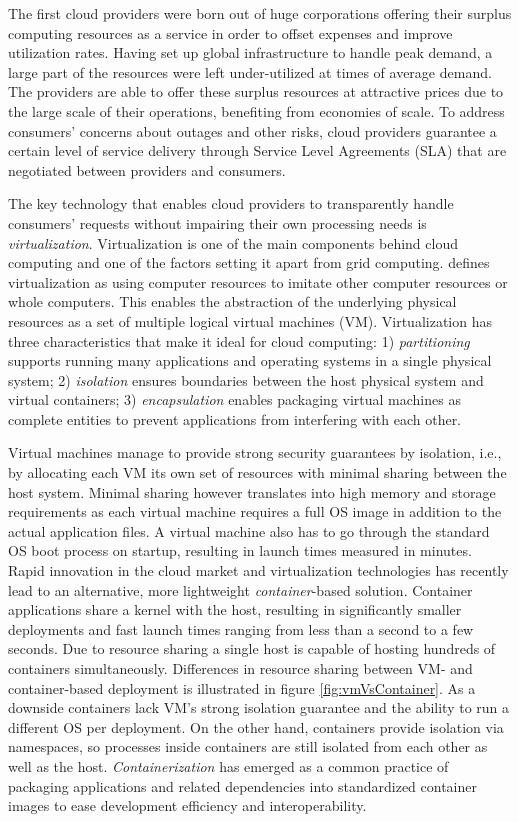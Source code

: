 The first cloud providers were born out of huge corporations offering their surplus computing resources as a service in order to offset expenses and improve utilization rates. Having set up global infrastructure to handle peak demand, a large part of the resources were left under-utilized at times of average demand. The providers are able to offer these surplus resources at attractive prices due to the large scale of their operations, benefiting from economies of scale. To address consumers' concerns about outages and other risks, cloud providers guarantee a certain level of service delivery through Service Level Agreements (SLA) that are negotiated between providers and consumers. \parencite{youseff08cloudOntology}

The key technology that enables cloud providers to transparently handle consumers' requests without impairing their own processing needs is \textit{virtualization}. Virtualization is one of the main components behind cloud computing and one of the factors setting it apart from grid computing. \textcite{sareen13cloudTypes} defines virtualization as using computer resources to imitate other computer resources or whole computers. This enables the abstraction of the underlying physical resources as a set of multiple logical virtual machines (VM). Virtualization has three characteristics that make it ideal for cloud computing: 1) \textit{partitioning} supports running many applications and operating systems in a single physical system; 2) \textit{isolation} ensures boundaries between the host physical system and virtual containers; 3) \textit{encapsulation} enables packaging virtual machines as complete entities to prevent applications from interfering with each other.

Virtual machines manage to provide strong security guarantees by isolation, i.e., by allocating each VM its own set of resources with minimal sharing between the host system. Minimal sharing however translates into high memory and storage requirements as each virtual machine requires a full OS image in addition to the actual application files. A virtual machine also has to go through the standard OS boot process on startup, resulting in launch times measured in minutes. Rapid innovation in the cloud market and virtualization technologies has recently lead to an alternative, more lightweight \textit{container}-based solution. Container applications share a kernel with the host, resulting in significantly smaller deployments and fast launch times ranging from less than a second to a few seconds. Due to resource sharing a single host is capable of hosting hundreds of containers simultaneously. Differences in resource sharing between VM- and container-based deployment is illustrated in figure \ref{fig:vmVsContainer}. As a downside containers lack VM's strong isolation guarantee and the ability to run a different OS per deployment. On the other hand, containers provide isolation via namespaces, so processes inside containers are still isolated from each other as well as the host. \textit{Containerization} has emerged as a common practice of packaging applications and related dependencies into standardized container images to ease development efficiency and interoperability. \parencite{pahl15containerization}

